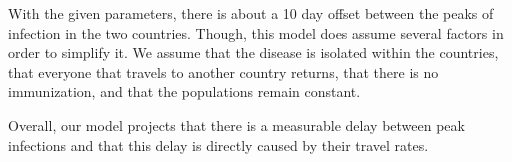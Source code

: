 \documentclass[11pt]{article}
\begin{document}
With the given parameters, there is about a 10 day offset between the
peaks of infection in the two countries. Though, this model does assume
several factors in order to simplify it. We assume that the disease is
isolated within the countries, that everyone that travels to another
country returns, that there is no immunization, and that the populations
remain constant.

    Overall, our model projects that there is a measurable delay between
peak infections and that this delay is directly caused by their travel
rates.


    
    
    
    
\end{document}
